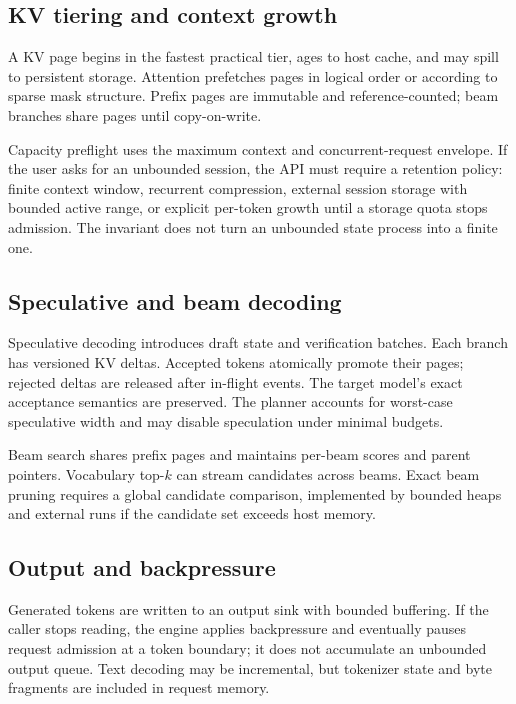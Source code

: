 \subsection{KV tiering and context growth}

A KV page begins in the fastest practical tier, ages to host cache, and may spill to persistent storage. Attention prefetches pages in logical order or according to sparse mask structure. Prefix pages are immutable and reference-counted; beam branches share pages until copy-on-write.

Capacity preflight uses the maximum context and concurrent-request envelope. If the user asks for an unbounded session, the API must require a retention policy: finite context window, recurrent compression, external session storage with bounded active range, or explicit per-token growth until a storage quota stops admission. The invariant does not turn an unbounded state process into a finite one.

\subsection{Speculative and beam decoding}

Speculative decoding introduces draft state and verification batches. Each branch has versioned KV deltas. Accepted tokens atomically promote their pages; rejected deltas are released after in-flight events. The target model's exact acceptance semantics are preserved. The planner accounts for worst-case speculative width and may disable speculation under minimal budgets.

Beam search shares prefix pages and maintains per-beam scores and parent pointers. Vocabulary top-$k$ can stream candidates across beams. Exact beam pruning requires a global candidate comparison, implemented by bounded heaps and external runs if the candidate set exceeds host memory.

\subsection{Output and backpressure}

Generated tokens are written to an output sink with bounded buffering. If the caller stops reading, the engine applies backpressure and eventually pauses request admission at a token boundary; it does not accumulate an unbounded output queue. Text decoding may be incremental, but tokenizer state and byte fragments are included in request memory.


